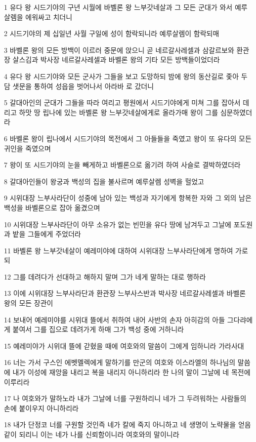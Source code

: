 \par 1 유다 왕 시드기야의 구년 시월에 바벨론 왕 느부갓네살과 그 모든 군대가 와서 예루살렘을 에워싸고 치더니
\par 2 시드기야의 제 십일년 사월 구일에 성이 함락되니라 예루살렘이 함락되매
\par 3 바벨론 왕의 모든 방백이 이르러 중문에 앉으니 곧 네르갈사레셀과 삼갈르보와 환관장 살스김과 박사장 네르갈사레셀과 바벨론 왕의 기타 모든 방백들이었더라
\par 4 유다 왕 시드기야와 모든 군사가 그들을 보고 도망하되 밤에 왕의 동산길로 좇아 두 담 샛문을 통하여 성읍을 벗어나서 아라바 로 갔더니
\par 5 갈대아인의 군대가 그들을 따라 여리고 평원에서 시드기야에게 미쳐 그를 잡아서 데리고 하맛 땅 립나에 있는 바벨론 왕 느부갓네살에게로 올라가매 왕이 그를 심문하였더라
\par 6 바벨론 왕이 립나에서 시드기야의 목전에서 그 아들들을 죽였고 왕이 또 유다의 모든 귀인을 죽였으며
\par 7 왕이 또 시드기야의 눈을 빼게하고 바벨론으로 옮기려 하여 사슬로 결박하였더라
\par 8 갈대아인들이 왕궁과 백성의 집을 불사르며 예루살렘 성벽을 헐었고
\par 9 시위대장 느부사라단이 성중에 남아 있는 백성과 자기에게 항복한 자와 그 외의 남은 백성을 바벨론으로 잡아 옮겼으며
\par 10 시위대장 느부사라단이 아무 소유가 없는 빈민을 유다 땅에 남겨두고 그날에 포도원과 밭을 그들에게 주었더라
\par 11 바벨론 왕 느부갓네살이 예레미야에 대하여 시위대장 느부사라단에게 명하여 가로되
\par 12 그를 데려다가 선대하고 해하지 말며 그가 네게 말하는 대로 행하라
\par 13 이에 시위대장 느부사라단과 환관장 느부사스반과 박사장 네르갈사레셀과 바벨론 왕의 모든 장관이
\par 14 보내어 예레미야를 시위대 뜰에서 취하여 내어 사반의 손자 아히감의 아들 그다랴에게 붙여서 그를 집으로 데려가게 하매 그가 백성 중에 거하니라
\par 15 예레미야가 시위대 뜰에 갇혔을 때에 여호와의 말씀이 그에게 임하니라 가라사대
\par 16 너는 가서 구스인 에벳멜렉에게 말하기를 만군의 여호와 이스라엘의 하나님의 말씀에 내가 이성에 재앙을 내리고 복을 내리지 아니하리라 한 나의 말이 그날에 네 목전에 이루리라
\par 17 나 여호와가 말하노라 내가 그날에 너를 구원하리니 네가 그 두려워하는 사람들의 손에 붙이우지 아니하리라
\par 18 내가 단정코 너를 구원할 것인즉 네가 칼에 죽지 아니하고 네 생명이 노략물을 얻음같이 되리니 이는 네가 나를 신뢰함이니라 여호와의 말이니라

